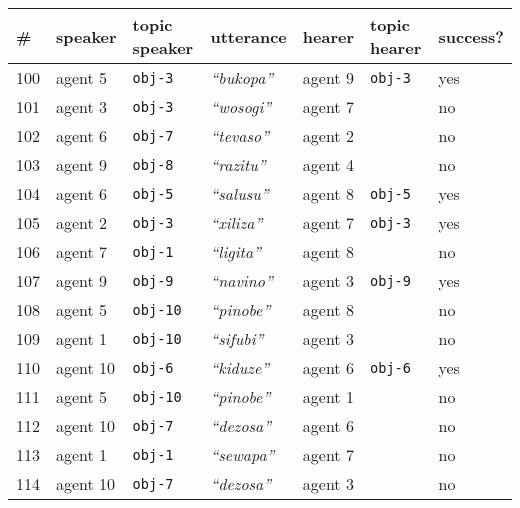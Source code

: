 
\renewcommand{\arraystretch}{1.3}{
\begin{tabular}{@{}llp{1cm}llp{1cm}l@{}}
  \# & speaker & topic speaker & utterance & hearer & topic hearer & success? \\
  \hline
100 & agent 5 & \texttt{obj-3} & \textit{``bukopa''} & agent 9 & \texttt{obj-3} & yes \\
101 & agent 3 & \texttt{obj-3} & \textit{``wosogi''} & agent 7 & \texttt{} & no \\
102 & agent 6 & \texttt{obj-7} & \textit{``tevaso''} & agent 2 & \texttt{} & no \\
103 & agent 9 & \texttt{obj-8} & \textit{``razitu''} & agent 4 & \texttt{} & no \\
104 & agent 6 & \texttt{obj-5} & \textit{``salusu''} & agent 8 & \texttt{obj-5} & yes \\
105 & agent 2 & \texttt{obj-3} & \textit{``xiliza''} & agent 7 & \texttt{obj-3} & yes \\
106 & agent 7 & \texttt{obj-1} & \textit{``ligita''} & agent 8 & \texttt{} & no \\
107 & agent 9 & \texttt{obj-9} & \textit{``navino''} & agent 3 & \texttt{obj-9} & yes \\
108 & agent 5 & \texttt{obj-10} & \textit{``pinobe''} & agent 8 & \texttt{} & no \\
109 & agent 1 & \texttt{obj-10} & \textit{``sifubi''} & agent 3 & \texttt{} & no \\
110 & agent 10 & \texttt{obj-6} & \textit{``kiduze''} & agent 6 & \texttt{obj-6} & yes \\
111 & agent 5 & \texttt{obj-10} & \textit{``pinobe''} & agent 1 & \texttt{} & no \\
112 & agent 10 & \texttt{obj-7} & \textit{``dezosa''} & agent 6 & \texttt{} & no \\
113 & agent 1 & \texttt{obj-1} & \textit{``sewapa''} & agent 7 & \texttt{} & no \\
114 & agent 10 & \texttt{obj-7} & \textit{``dezosa''} & agent 3 & \texttt{} & no \\
\end{tabular}}


